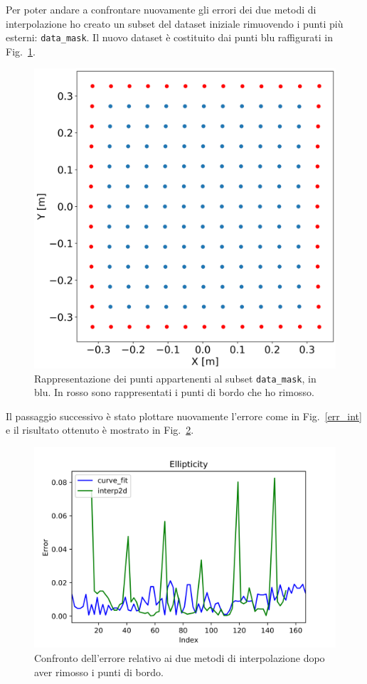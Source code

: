 \documentclass[12pt,a4paper,final]{book}
\begin{document}
Per poter andare a confrontare nuovamente gli errori dei due metodi di interpolazione ho creato un subset del dataset iniziale rimuovendo i punti più esterni: \texttt{data\_mask}. Il nuovo dataset è costituito dai punti blu raffigurati in Fig.~\ref{data_mask}.

\begin{figure}[!ht]
	\centering
	\includegraphics[width=0.7\linewidth]{../figures/PuntiMask.png}
	\caption{Rappresentazione dei punti appartenenti al subset \texttt{data\_mask}, in blu. In rosso sono rappresentati i punti di bordo che ho rimosso.}
	\label{data_mask}
\end{figure}

Il passaggio successivo è stato plottare nuovamente l'errore come in Fig.~\ref{err_int} e il risultato ottenuto è mostrato in Fig.~\ref{err_int_mask}.

\begin{figure}[!ht]
	\centering
	\includegraphics[scale=0.8]{../figures/error_comparison.png}
	\caption{Confronto dell'errore relativo ai due metodi di interpolazione dopo aver rimosso i punti di bordo.}
	\label{err_int_mask}
\end{figure}
\end{document}
